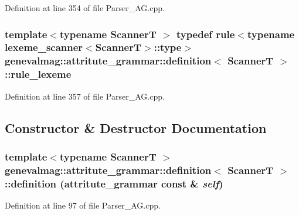Definition at line 354 of file Parser\_\-AG.cpp.

\hypertarget{structgenevalmag_1_1attritute__grammar_1_1definition_ae8f879e64d097084c7b09ca23778b66b}{
\subsubsection[{rule\_\-lexeme}]{\setlength{\rightskip}{0pt plus 5cm}template$<$typename ScannerT $>$ typedef rule$<$typename lexeme\_\-scanner$<$ScannerT$>$::type$>$ {\bf genevalmag::attritute\_\-grammar::definition}$<$ ScannerT $>$::{\bf rule\_\-lexeme}}}
\label{structgenevalmag_1_1attritute__grammar_1_1definition_ae8f879e64d097084c7b09ca23778b66b}


Definition at line 357 of file Parser\_\-AG.cpp.



\subsection{Constructor \& Destructor Documentation}
\hypertarget{structgenevalmag_1_1attritute__grammar_1_1definition_a77a5f8d316d607055d02312370c825cc}{
\subsubsection[{definition}]{\setlength{\rightskip}{0pt plus 5cm}template$<$typename ScannerT $>$ {\bf genevalmag::attritute\_\-grammar::definition}$<$ ScannerT $>$::{\bf definition} ({\bf attritute\_\-grammar} const \& {\em self})}}
\label{structgenevalmag_1_1attritute__grammar_1_1definition_a77a5f8d316d607055d02312370c825cc}


Definition at line 97 of file Parser\_\-AG.cpp.



